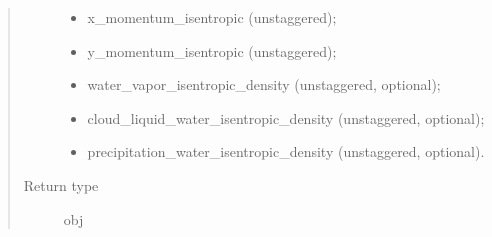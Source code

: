 \documentclass[letterpaper,10pt,english]{sphinxmanual}
\begin{document}
\begin{fulllineitems}
\begin{fulllineitems}
\begin{quote}
\begin{description}
\begin{itemize}
\item {} 
x\_momentum\_isentropic (unstaggered);

\item {} 
y\_momentum\_isentropic (unstaggered);

\item {} 
water\_vapor\_isentropic\_density (unstaggered, optional);

\item {} 
cloud\_liquid\_water\_isentropic\_density (unstaggered, optional);

\item {} 
precipitation\_water\_isentropic\_density (unstaggered, optional).

\end{itemize}


\item[{Return type}] \leavevmode
obj

\end{description}\end{quote}

\end{fulllineitems}


\end{fulllineitems}

\end{document}
